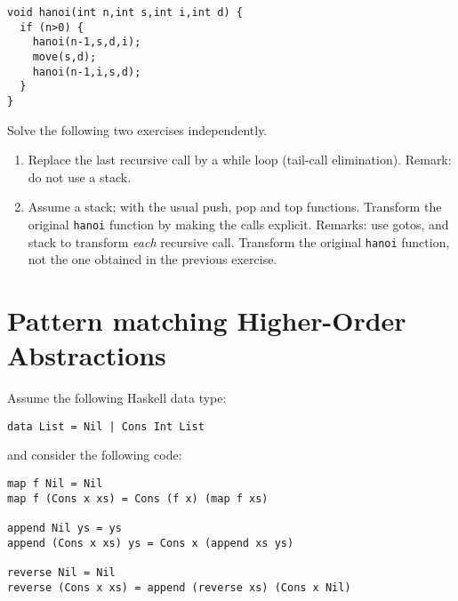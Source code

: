 \documentclass{article}
\newcommand{\answer}[1]{}
\begin{document}
\begin{verbatim}
void hanoi(int n,int s,int i,int d) {
  if (n>0) {
    hanoi(n-1,s,d,i);
    move(s,d);
    hanoi(n-1,i,s,d);
  }
}
\end{verbatim}

Solve the following two exercises independently.
\begin{enumerate}
\item Replace the last recursive call by a while loop (tail-call
  elimination). Remark: do not use a stack. 

\answer{
\begin{verbatim}
    void move_many(int n, int source, int intermediate, int target) {
      while (n > 0) {
        move_many(n-1,source,target,intermediate);
        move_disk(source,target);
        n = n-1;
        swap(source,intermediate);
      }
    }
\end{verbatim}
}
\item Assume a stack; with the usual push, pop and top
  functions. Transform the original \texttt{hanoi} function by making
  the calls explicit. Remarks: use gotos, and stack to transform \emph{each}
  recursive call. Transform the original \texttt{hanoi} function, not
  the one obtained in the previous exercise. 
  \answer{
    \begin{verbatim}
      void move_many(int n, int s, int i, int d) {
        push(n,s,i,d,0);
      call:
        if (stk->n!=0) {
          push(stk->n-1,stk->s,stk->i,stk->d,1);
          goto call;
      loc1:
          move_disk(stk->s,stk->d);
          push(stk->n-1,stk->i,stk->s,stk->d,2);;
          goto call;
      loc2:
        }
        caller = stk->caller;
        pop();
        if (caller == 1) goto loc1;
        if (caller == 2) goto loc2;
      }
    \end{verbatim}
  }
\end{enumerate}
\newpage
\section{Pattern matching Higher-Order Abstractions}

Assume the following Haskell data type:
\begin{verbatim}
data List = Nil | Cons Int List
\end{verbatim}
and consider the following code:
\begin{verbatim}
map f Nil = Nil
map f (Cons x xs) = Cons (f x) (map f xs)

append Nil ys = ys
append (Cons x xs) ys = Cons x (append xs ys)

reverse Nil = Nil
reverse (Cons x xs) = append (reverse xs) (Cons x Nil)
\end{verbatim}
\end{document}
